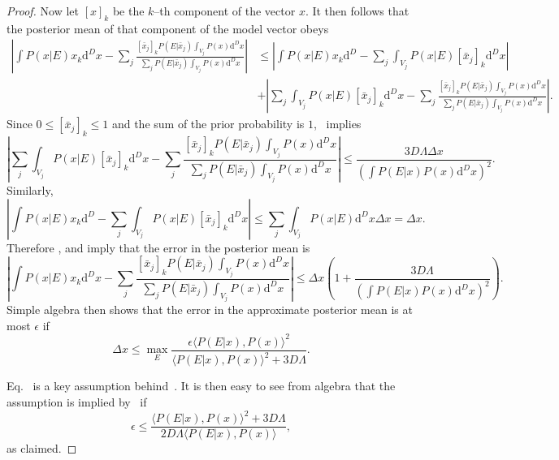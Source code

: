 \documentclass[aps,amsmath,onecolumn,amssymb]{revtex4}
\begin{document}
\begin{proof}
Now let $[x]_k$ be the $k$--th component of the vector $x$.  It then follows that the posterior mean of that component of the model vector obeys
\begin{align}
\left|\int P(x|E) x_k \mathrm{d}^D x- \sum_j  \frac{[\bar{x}_j]_k P(E|\bar{x}_j)\int_{V_j} P(x) \mathrm{d}^D x}{\sum_jP(E|\bar{x}_j)\int_{V_j} P(x) \mathrm{d}^D x}\right| &\le \left|\int P(x|E) x_k \mathrm{d}^D -\sum_j \int_{V_j} P(x|E)[\bar{x}_j]_k \mathrm{d}^D x \right|\nonumber\\
& + \left|\sum_j \int_{V_j} P(x|E)[\bar{x}_j]_k \mathrm{d}^D x- \sum_j  \frac{[\bar{x}_j]_k P(E|\bar{x}_j)\int_{V_j} P(x) \mathrm{d}^D x}{\sum_jP(E|\bar{x}_j)\int_{V_j} P(x) \mathrm{d}^D x} \right|.\label{eq:meantriangle}
\end{align}
Since $0\le [\bar{x}_j]_k \le 1$ and the sum of the prior probability is $1$,~ implies
\begin{equation}
\left|\sum_j \int_{V_j} P(x|E)[\bar{x}_j]_k \mathrm{d}^D x- \sum_j  \frac{[\bar{x}_j]_k P(E|\bar{x}_j)\int_{V_j} P(x) \mathrm{d}^D x}{\sum_jP(E|\bar{x}_j)\int_{V_j} P(x) \mathrm{d}^D x} \right| \le  \frac{3D\Lambda\Delta x}{\left(\int P(E|x) P(x) \mathrm{d}^D x\right)^2}.\label{eq:meantriangle1}
\end{equation}
Similarly,
\begin{equation}
\left|\int P(x|E) x_k \mathrm{d}^D -\sum_j \int_{V_j} P(x|E)[\bar{x}_j]_k \mathrm{d}^D x \right|\le \sum_j \int_{V_j} P(x|E) \mathrm{d}^D x \Delta x = \Delta x.\label{eq:meantriangle2}
\end{equation}
Therefore ,  and  imply that the error in the posterior mean is
\begin{equation}
\left|\int P(x|E) x_k \mathrm{d}^D x- \sum_j  \frac{[\bar{x}_j]_k P(E|\bar{x}_j)\int_{V_j} P(x) \mathrm{d}^D x}{\sum_jP(E|\bar{x}_j)\int_{V_j} P(x) \mathrm{d}^D x}\right| \le \Delta x\left(1+\frac{3D\Lambda}{\left(\int P(E|x) P(x) \mathrm{d}^D x\right)^2} \right).\label{eq:meanbound}
\end{equation}
Simple algebra then shows that the error in the approximate posterior mean is at most $\epsilon$ if
\begin{equation}
\Delta x \le \max_E \frac{\epsilon \langle P(E|x),P(x)\rangle^2}{\langle P(E|x),P(x)\rangle^2+3{D} \Lambda}.\label{eq:Deltaxbd}
\end{equation}

Eq.~ is a key assumption behind~.  It is then easy to see from algebra that the assumption is implied by~ if
\begin{equation}
\epsilon \le \frac{\langle P(E|x),P(x)\rangle^2+ 3D\Lambda}{2 D\Lambda\langle P(E|x),P(x)\rangle},
\end{equation}
as claimed.
\end{proof}
\end{document}
